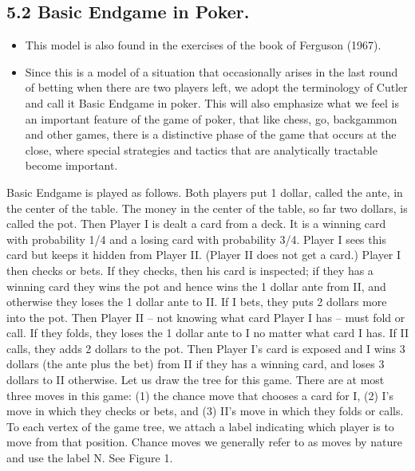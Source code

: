 \begin{framed}
\section{5.2 Basic Endgame in Poker.} 
\begin{itemize}
\itme One of the simplest and most useful mathematical
models of a situation that occurs in poker is called the “classical betting situation” by
Friedman (1971) and “basic endgame” by Cutler (1976). These papers provide explicit
situations in the game of stud poker and of lowball stud for which the model gives a very
accurate description. \item This model is also found in the exercises of the book of Ferguson
(1967).\item Since this is a model of a situation that occasionally arises in the last round of
betting when there are two players left, we adopt the terminology of Cutler and call it
Basic Endgame in poker. This will also emphasize what we feel is an important feature of
the game of poker, that like chess, go, backgammon and other games, there is a distinctive
phase of the game that occurs at the close, where special strategies and tactics that are
analytically tractable become important.
\end{itemize}

Basic Endgame is played as follows. Both players put 1 dollar, called the ante, in the
center of the table. The money in the center of the table, so far two dollars, is called the
pot. Then Player I is dealt a card from a deck. It is a winning card with probability 1/4
and a losing card with probability 3/4. Player I sees this card but keeps it hidden from
Player II. (Player II does not get a card.) Player I then checks or bets. If they checks, then
his card is inspected; if they has a winning card they wins the pot and hence wins the 1 dollar
ante from II, and otherwise they loses the 1 dollar ante to II. If I bets, they puts 2 dollars more
into the pot. Then Player II – not knowing what card Player I has – must fold or call. If
they folds, they loses the 1 dollar ante to I no matter what card I has. If II calls, they adds 2
dollars to the pot. Then Player I’s card is exposed and I wins 3 dollars (the ante plus the
bet) from II if they has a winning card, and loses 3 dollars to II otherwise.
Let us draw the tree for this game. There are at most three moves in this game: (1)
the chance move that chooses a card for I, (2) I’s move in which they checks or bets, and (3)
II’s move in which they folds or calls. To each vertex of the game tree, we attach a label
indicating which player is to move from that position. Chance moves we generally refer to
as moves by nature and use the label N. See Figure 1.


\end{framed}
